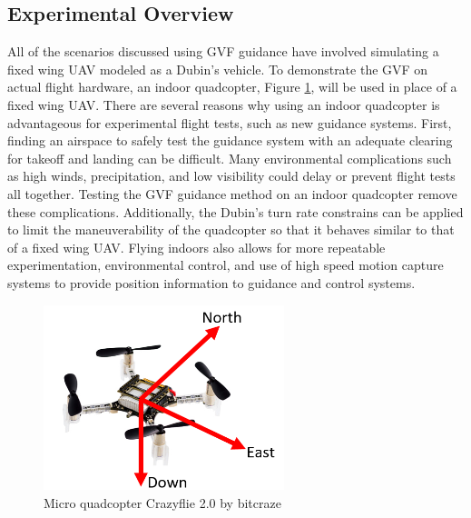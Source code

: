 \documentclass[numbered,pdftex]{ohio-etd}
\begin{document}
\subsection{Experimental Overview}
All of the scenarios discussed using GVF guidance have involved simulating a fixed wing UAV modeled as a Dubin's vehicle. To demonstrate the GVF on actual flight hardware, an indoor quadcopter, Figure \ref{fig:crazyflie2}, will be used in place of a fixed wing UAV. There are several reasons why using an indoor quadcopter is advantageous for experimental flight tests, such as new guidance systems. First, finding an airspace to safely test the guidance system with an adequate clearing for takeoff and landing can be difficult. Many environmental complications such as high winds, precipitation, and low visibility could delay or prevent flight tests all together. Testing the GVF guidance method on an indoor quadcopter remove these complications. Additionally, the Dubin's turn rate constrains can be applied to limit the maneuverability of the quadcopter so that it behaves similar to that of a fixed wing UAV. Flying indoors also allows for more repeatable experimentation, environmental control, and use of high speed motion capture systems to provide position information to guidance and control systems. 



\begin{figure}
	\centering
	\includegraphics[trim=0 0 0 0,clip,width=7cm]{PaperFigures/methods/crazyflieNED}
	\caption{Micro quadcopter Crazyflie 2.0 by bitcraze}
	\label{fig:crazyflie2}
\end{figure}
\end{document}
